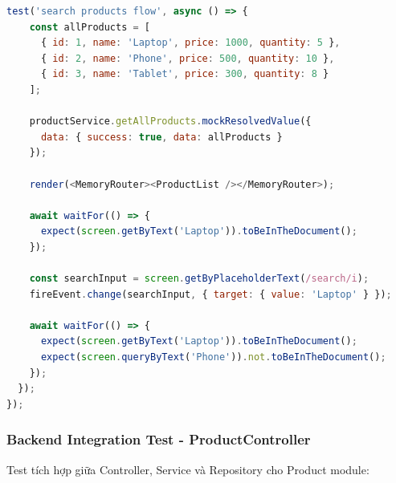 \begin{lstlisting}[language=JavaScript, caption=Frontend Product Integration Test]
  test('search products flow', async () => {
    const allProducts = [
      { id: 1, name: 'Laptop', price: 1000, quantity: 5 },
      { id: 2, name: 'Phone', price: 500, quantity: 10 },
      { id: 3, name: 'Tablet', price: 300, quantity: 8 }
    ];

    productService.getAllProducts.mockResolvedValue({
      data: { success: true, data: allProducts }
    });

    render(<MemoryRouter><ProductList /></MemoryRouter>);

    await waitFor(() => {
      expect(screen.getByText('Laptop')).toBeInTheDocument();
    });

    const searchInput = screen.getByPlaceholderText(/search/i);
    fireEvent.change(searchInput, { target: { value: 'Laptop' } });

    await waitFor(() => {
      expect(screen.getByText('Laptop')).toBeInTheDocument();
      expect(screen.queryByText('Phone')).not.toBeInTheDocument();
    });
  });
});
\end{lstlisting}

\subsubsection{Backend Integration Test - ProductController}
Test tích hợp giữa Controller, Service và Repository cho Product module:

